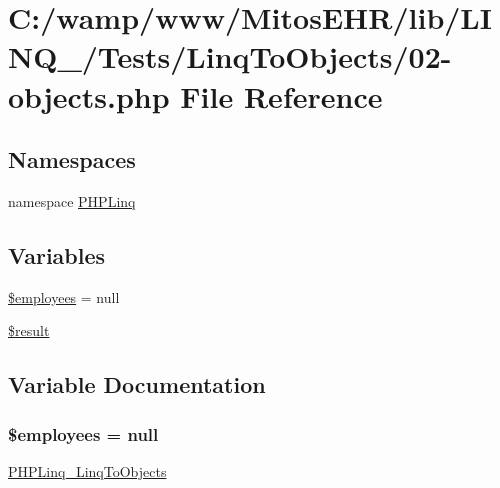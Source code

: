 \hypertarget{_linq_to_objects_202-objects_8php}{\section{\-C\-:/wamp/www/\-Mitos\-E\-H\-R/lib/\-L\-I\-N\-Q\-\_/\-Tests/\-Linq\-To\-Objects/02-\/objects.php \-File \-Reference}
\label{_linq_to_objects_202-objects_8php}
}
\subsection*{\-Namespaces}
\begin{DoxyCompactItemize}
\item 
namespace \hyperlink{namespace_p_h_p_linq}{\-P\-H\-P\-Linq}
\end{DoxyCompactItemize}
\subsection*{\-Variables}
\begin{DoxyCompactItemize}
\item 
\hyperlink{_linq_to_objects_202-objects_8php_a598c06abe9d65a9d2990e39693ce2c27}{\$employees} = null
\item 
\hyperlink{_linq_to_objects_202-objects_8php_a112ef069ddc0454086e3d1e6d8d55d07}{\$result}
\end{DoxyCompactItemize}


\subsection{\-Variable \-Documentation}
\hypertarget{_linq_to_objects_202-objects_8php_a598c06abe9d65a9d2990e39693ce2c27}{
\subsubsection[{\$employees}]{\setlength{\rightskip}{0pt plus 5cm}\$employees = null}}\label{_linq_to_objects_202-objects_8php_a598c06abe9d65a9d2990e39693ce2c27}
\hyperlink{class_p_h_p_linq___linq_to_objects}{\-P\-H\-P\-Linq\-\_\-\-Linq\-To\-Objects} 

